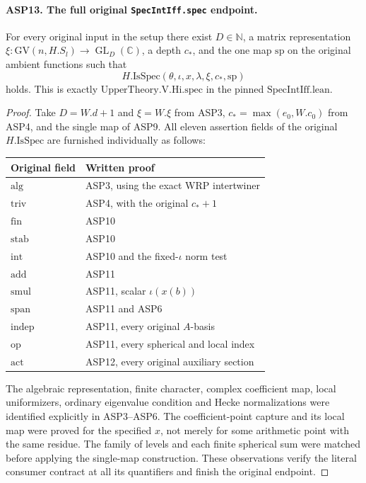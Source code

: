 \documentclass[11pt,a4paper]{article}
\numberwithin{equation}{section}
\theoremstyle{remark}\newtheorem{remark}[theorem]{Remark}
\begin{document}
\paragraph{ASP13. The full original \texttt{Spec\allowbreak Int\allowbreak Iff.\allowbreak spec} endpoint.}
\label{claim:ASP13}
For every original input in the setup there
exist $D\in\mathbb N$, a matrix representation
$\xi:\mathrm{GV}(n,\allowbreak{} H.S_l)\to\operatorname{GL}_D(\mathbb C)$,
a depth $c_*$, and the one map $\mathrm{sp}$
on the original ambient functions such that
\[
          H.\mathrm{IsSpec}(\theta,\iota,\allowbreak{} x,\lambda,
                                                \xi,\allowbreak{} c_*,\mathrm{sp})
\]
holds.  This is exactly
$\mathrm{UpperTheory.V.Hi.spec}$ in the pinned
$\mathrm{SpecIntIff.lean}$.
\begin{proof}
Take $D=W.d+1$ and $\xi=W.\xi$ from ASP3,
$c_*=\max(e_0,\allowbreak{} W.c_0)$ from ASP4, and the
single map of ASP9.  All eleven assertion
fields of the original $H.\mathrm{IsSpec}$
are furnished individually as follows:
\begin{center}
\begin{tabular}{ll}
Original field & Written proof \\
\hline
$\mathrm{alg}$ & ASP3, using the exact WRP intertwiner \\
$\mathrm{triv}$ & ASP4, with the original $c_*+1$ \\
$\mathrm{fin}$ & ASP10 \\
$\mathrm{stab}$ & ASP10 \\
$\mathrm{int}$ & ASP10 and the fixed-$\iota$ norm test \\
$\mathrm{add}$ & ASP11 \\
$\mathrm{smul}$ & ASP11, scalar $\iota(x(b))$ \\
$\mathrm{span}$ & ASP11 and ASP6 \\
$\mathrm{indep}$ & ASP11, every original $A$-basis \\
$\mathrm{op}$ & ASP11, every spherical and local index \\
$\mathrm{act}$ & ASP12, every original auxiliary section
\end{tabular}
\end{center}
The algebraic representation, finite character,
complex coefficient map, local uniformizers,
ordinary eigenvalue condition and Hecke
normalizations were identified explicitly in
ASP3--ASP6.  The coefficient-point capture
and its local map were proved for the
specified $x$, not merely for some arithmetic
point with the same residue.  The family of
levels and each finite spherical sum were
matched before applying the single-map
construction.  These observations verify the
literal consumer contract at all its
quantifiers and finish the original endpoint.
\end{proof}
\end{document}
